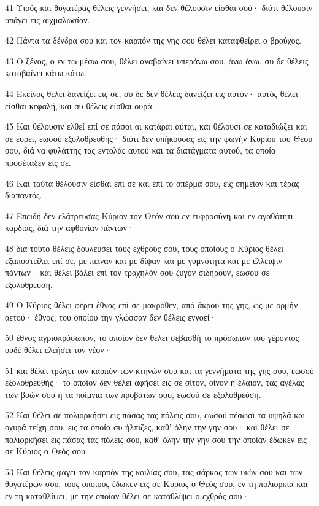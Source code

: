 \par 41 Υιούς και θυγατέρας θέλεις γεννήσει, και δεν θέλουσιν είσθαι σού· διότι θέλουσιν υπάγει εις αιχμαλωσίαν.
\par 42 Πάντα τα δένδρα σου και τον καρπόν της γης σου θέλει καταφθείρει ο βρούχος.
\par 43 Ο ξένος, ο εν τω μέσω σου, θέλει αναβαίνει υπεράνω σου, άνω άνω, συ δε θέλεις καταβαίνει κάτω κάτω.
\par 44 Εκείνος θέλει δανείζει εις σε, συ δε δεν θέλεις δανείζει εις αυτόν· αυτός θέλει είσθαι κεφαλή, και συ θέλεις είσθαι ουρά.
\par 45 Και θέλουσιν ελθεί επί σε πάσαι αι κατάραι αύται, και θέλουσι σε καταδιώξει και σε ευρεί, εωσού εξολοθρευθής· διότι δεν υπήκουσας εις την φωνήν Κυρίου του Θεού σου, διά να φυλάττης τας εντολάς αυτού και τα διατάγματα αυτού, τα οποία προσέταξεν εις σε.
\par 46 Και ταύτα θέλουσιν είσθαι επί σε και επί το σπέρμα σου, εις σημείον και τέρας διαπαντός.
\par 47 Επειδή δεν ελάτρευσας Κύριον τον Θεόν σου εν ευφροσύνη και εν αγαθότητι καρδίας, διά την αφθονίαν πάντων·
\par 48 διά τούτο θέλεις δουλεύσει τους εχθρούς σου, τους οποίους ο Κύριος θέλει εξαποστείλει επί σε, με πείναν και με δίψαν και με γυμνότητα και με έλλειψιν πάντων· και θέλει βάλει επί τον τράχηλόν σου ζυγόν σιδηρούν, εωσού σε εξολοθρεύση.
\par 49 Ο Κύριος θέλει φέρει έθνος επί σε μακρόθεν, από άκρου της γης, ως με ορμήν αετού· έθνος, του οποίου την γλώσσαν δεν θέλεις εννοεί·
\par 50 έθνος αγριοπρόσωπον, το οποίον δεν θέλει σεβασθή το πρόσωπον του γέροντος ουδέ θέλει ελεήσει τον νέον·
\par 51 και θέλει τρώγει τον καρπόν των κτηνών σου και τα γεννήματα της γης σου, εωσού εξολοθρευθής· το οποίον δεν θέλει αφήσει εις σε σίτον, οίνον ή έλαιον, τας αγέλας των βοών σου ή τα ποίμνια των προβάτων σου, εωσού σε εξολοθρεύση.
\par 52 Και θέλει σε πολιορκήσει εις πάσας τας πόλεις σου, εωσού πέσωσι τα υψηλά και οχυρά τείχη σου, εις τα οποία συ ήλπιζες, καθ' όλην την γην σου· και θέλει σε πολιορκήσει εις πάσας τας πόλεις σου, καθ' όλην την γην σου την οποίαν έδωκεν εις σε Κύριος ο Θεός σου.
\par 53 Και θέλεις φάγει τον καρπόν της κοιλίας σου, τας σάρκας των υιών σου και των θυγατέρων σου, τους οποίους έδωκεν εις σε Κύριος ο Θεός σου, εν τη πολιορκία και εν τη καταθλίψει, με την οποίαν θέλει σε καταθλίψει ο εχθρός σου·
